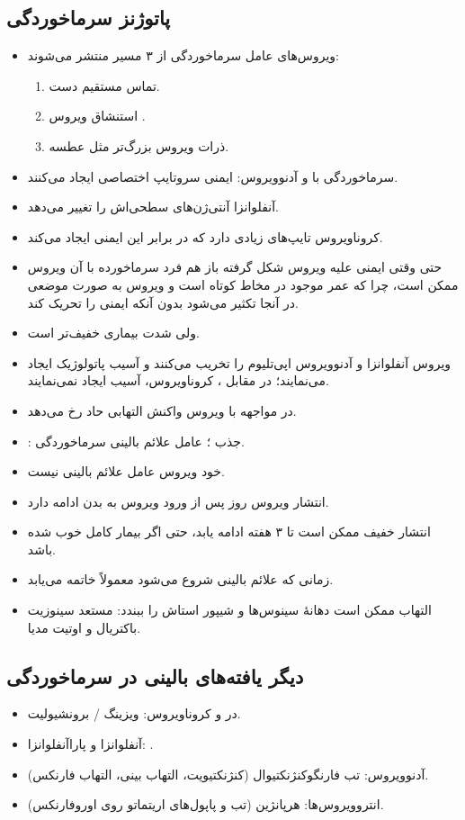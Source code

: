 \documentclass[12pt,a4paper]{article}
\begin{document}
\subsection*{پاتوژنز سرماخوردگی}
\begin{itemize}
\item ویروس‌های عامل سرماخوردگی از ۳ مسیر منتشر می‌شوند:
\begin{enumerate}
\item تماس مستقیم دست.
\item استنشاق ویروس .
\item ذرات ویروس بزرگ‌تر مثل عطسه.
\end{enumerate}
\item سرماخوردگی با  و آدنوویروس: ایمنی سروتایپ اختصاصی ایجاد می‌کنند.
\item آنفلوانزا آنتی‌ژن‌های سطحی‌اش را تغییر می‌دهد.
\item کروناویروس تایپ‌های زیادی دارد که در برابر این ایمنی ایجاد می‌کند.
\item حتی وقتی ایمنی علیه ویروس شکل گرفته باز هم فرد سرماخورده با آن ویروس ممکن است، چرا که عمر  موجود در مخاط کوتاه است و ویروس به صورت موضعی در آنجا تکثیر می‌شود بدون آنکه ایمنی را تحریک کند.
\item ولی شدت بیماری خفیف‌تر است.
\item ویروس آنفلوانزا و آدنوویروس اپی‌تلیوم را تخریب می‌کنند و آسیب پاتولوژیک ایجاد می‌نمایند؛ در مقابل ، کروناویروس،  آسیب ایجاد نمی‌نمایند.
\item در مواجهه با ویروس واکنش التهابی حاد رخ می‌دهد.
\item {}: جذب ؛ عامل علائم بالینی سرماخوردگی.
\item خود ویروس عامل علائم بالینی نیست.
\item انتشار ویروس  روز پس از ورود ویروس به بدن ادامه دارد.
\item انتشار خفیف ممکن است تا ۳ هفته ادامه یابد، حتی اگر بیمار کامل خوب شده باشد.
\item زمانی که علائم بالینی شروع می‌شود معمولاً  خاتمه می‌یابد.
\item التهاب ممکن است دهانهٔ سینوس‌ها و شیپور استاش را ببندد: مستعد سینوزیت باکتریال و اوتیت مدیا.
\end{itemize}

\subsection*{دیگر یافته‌های بالینی در سرماخوردگی}
\begin{itemize}
\item در  و کروناویروس: ویزینگ / برونشیولیت.
\item آنفلوانزا و پاراآنفلوانزا: .
\item آدنوویروس: تب فارنگوکنژنکتیوال (کنژنکتیویت، التهاب بینی، التهاب فارنکس).
\item انتروویروس‌ها: هرپانژین (تب و پاپول‌های اریتماتو روی اوروفارنکس).
\end{itemize}
\end{document}
